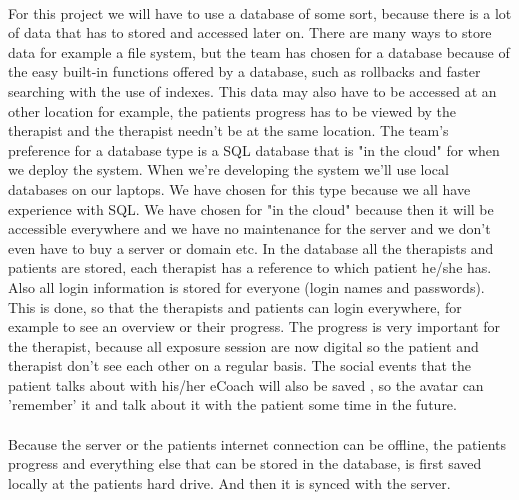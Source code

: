 
\paragraph{}
For this project we will have to use a database of some sort, because there is a lot of data that has to stored and accessed later on. There are many ways to store data for example a file system, but the team has chosen for a database because of the easy built-in functions offered by a database, such as rollbacks and faster searching with the use of indexes.
This data may also have to be accessed at an other location for example, the patients progress has to be viewed by the therapist and the therapist needn't be at the same location. The team's preference for a database type is a SQL database that is "in the cloud" for when we deploy the system. When we're developing the system we'll use local databases on our laptops. 
We have chosen for this type because we all have experience with SQL. We have chosen for "in the cloud" because then it will be accessible everywhere and we have no maintenance for the server and we don't even have to buy a server or domain etc. 
In the database all the therapists and patients are stored, each therapist has a reference to which patient he/she has. Also all login information is stored for everyone (login names and passwords). This is done, so that the therapists and patients can login everywhere, for example to see an overview or their progress. The progress is very important for the therapist, because all exposure session are now digital so the patient and therapist don't see each other on a regular basis.
The social events that the patient talks about with his/her eCoach will also be saved , so the avatar can 'remember' it and talk about it with the patient some time in the future.
\paragraph{}
Because the server or the patients internet connection can be offline, the patients progress and everything else that can be stored in the database, is first saved locally at the patients hard drive. And then it is synced with the server.